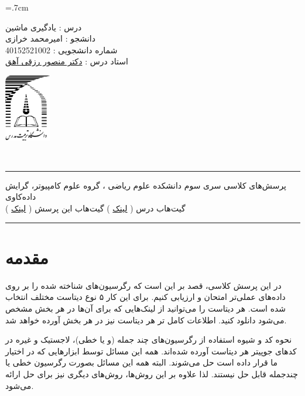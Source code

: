 \documentclass[a4paper, 12pt]{article}
\begin{document}
	
\noindent
\begin{minipage}[c]{5cm}
	\baselineskip=.7cm
	\begin{flushright}
		درس : یادگیری ماشین 
		\\
		دانشجو :
		امیرمحمد خرازی
		\\
		شماره دانشجویی :
		40152521002 
		\\
		استاد درس :  
		\href{mrezghi.ir}{دکتر منصور رزقی آهق}
	\end{flushright}
\end{minipage}
\hfill
\begin{minipage}[c]{3cm}
	\begin{center}
		\href{modares.ac.ir}{
			\includegraphics[width=2cm]{logo.png}}
	\end{center}	
\end{minipage}
\\[1mm]
\hrule depth .5mm \relax
\begin{flushright}
	پرسش‌های کلاسی سری سوم
	\hfill
	دانشکده علوم ریاضی ، گروه علوم کامپیوتر، گرایش داده‌کاوی
	\\
	\vspace{5mm}
	گیت‌هاب درس (
	\href{https://github.com/A-M-Kharazi/Machine-Learning-TMU.git}{لینک}
	)
	\hfill
	گیت‌هاب این پرسش (
	\href{https://github.com/A-M-Kharazi/Machine-Learning-TMU/tree/main/Questions/Q-Series3}{لینک}
	)
\end{flushright}

\hrule depth .5mm\relax


\section*{مقدمه}

در این پرسش کلاسی، قصد بر این است که رگرسیون‌های شناخته شده را بر روی داده‌های عملی‌تر امتحان و ارزیابی کنیم. برای این کار ۵ نوع دیتاست مختلف انتخاب شده است. هر دیتاست را می‌توانید از لینک‌هایی که برای آن‌ها در هر بخش مشخص می‌شود دانلود کنید. اطلاعات کامل تر هر دیتاست نیز در هر بخش آورده خواهد شد. 


نحوه کد و شیوه استفاده از رگرسیون‌های چند جمله (و یا خطی)، لاجستیک و غیره در کد‌های جوپیتر هر دیتاست آورده شده‌اند. همه این مسائل توسط ابزار‌هایی که 
در اختیار ما قرار داده است حل می‌شوند. البته همه این مسائل بصورت رگرسیون خطی یا چندجمله قابل حل نیستند. لذا علاوه بر این روش‌ها، روش‌های دیگری نیز برای حل ارائه می‌‌شود.
\end{document}
